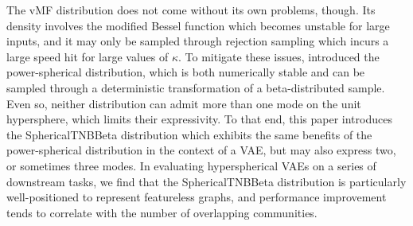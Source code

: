 The vMF distribution does not come without its own problems, though. Its density involves the modified Bessel function
which becomes unstable for large inputs, and it may only be sampled through rejection sampling which incurs a large
speed hit for large values of $\kappa$. To mitigate these issues, \cite{decao2020powersphericaldistribution} introduced
the power-spherical distribution, which is both numerically stable and can be sampled through a deterministic transformation
of a beta-distributed sample. Even so, neither distribution can admit more than one mode on the unit hypersphere, which
limits their expressivity. To that end, this paper introduces the SphericalTNBBeta distribution which exhibits the same
benefits of the power-spherical distribution in the context of a VAE, but may also express two, or sometimes three modes.
In evaluating hyperspherical VAEs on a series of downstream tasks, we find that the SphericalTNBBeta distribution is particularly
well-positioned to represent featureless graphs, and performance improvement tends to correlate with the number of overlapping
communities.

